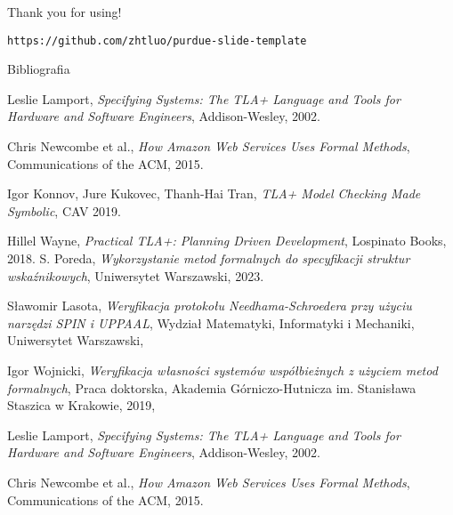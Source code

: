 \documentclass{purdue-poster}
\begin{document}
\begin{frame}{}
\begin{columns}[c]
\begin{column}{.48\linewidth}
\begin{block}{Thank you for using!}
        {\small\texttt{https://github.com/zhtluo/purdue-slide-template}\par}
    \end{block}

    \begin{block}{\large Bibliografia}
        {\scriptsize 
        \begin{thebibliography}{00}
        \setlength{\itemsep}{0pt}
        \setlength{\parskip}{0pt} 
            Leslie Lamport, \emph{Specifying Systems: The TLA+ Language and Tools for Hardware and Software Engineers}, Addison-Wesley, 2002.
          
            Chris Newcombe et al., \emph{How Amazon Web Services Uses Formal Methods}, Communications of the ACM, 2015.
          
            Igor Konnov, Jure Kukovec, Thanh-Hai Tran, \emph{TLA+ Model Checking Made Symbolic}, CAV 2019.
          
            Hillel Wayne, \emph{Practical TLA+: Planning Driven Development}, Lospinato Books, 2018.
            S. Poreda,
            \textit{Wykorzystanie metod formalnych do specyfikacji struktur wskaźnikowych},
            Uniwersytet Warszawski, 2023.
        
            Sławomir Lasota,
            \textit{Weryfikacja protokołu Needhama-Schroedera przy użyciu narzędzi SPIN i UPPAAL},
            Wydział Matematyki, Informatyki i Mechaniki, Uniwersytet Warszawski,
        
            Igor Wojnicki,
            \textit{Weryfikacja własności systemów współbieżnych z użyciem metod formalnych},
            Praca doktorska, Akademia Górniczo-Hutnicza im. Stanisława Staszica w Krakowie, 2019,

            Leslie Lamport, \emph{Specifying Systems: The TLA+ Language and Tools for Hardware and Software Engineers}, Addison-Wesley, 2002.
        
            Chris Newcombe et al., \emph{How Amazon Web Services Uses Formal Methods}, Communications of the ACM, 2015.
        

\end{thebibliography}}
\end{block}
\end{column}
\end{columns}
\end{frame}
\end{document}
